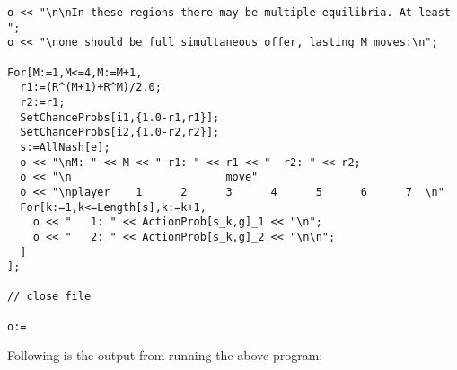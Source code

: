{\begin{verbatim}
o << "\n\nIn these regions there may be multiple equilibria. At least ";
o << "\none should be full simultaneous offer, lasting M moves:\n";

For[M:=1,M<=4,M:=M+1,
  r1:=(R^(M+1)+R^M)/2.0;
  r2:=r1;
  SetChanceProbs[i1,{1.0-r1,r1}];
  SetChanceProbs[i2,{1.0-r2,r2}];
  s:=AllNash[e];
  o << "\nM: " << M << " r1: " << r1 << "  r2: " << r2;
  o << "\n                        move" 
  o << "\nplayer    1      2      3      4      5      6      7  \n" 
  For[k:=1,k<=Length[s],k:=k+1,
    o << "   1: " << ActionProb[s_k,g]_1 << "\n";
    o << "   2: " << ActionProb[s_k,g]_2 << "\n\n";
  ]
];

// close file

o:=
\end{verbatim}
}

\noindent
Following is the output from running the above program:
